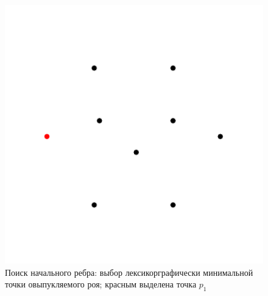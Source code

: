 \documentclass[14pt]{extarticle}
\begin{document}
\begin{figure}[t]
  {}\hfill%
  \begin{minipage}{0.4\textwidth}
    \centering

    \hspace*{-0.1\textwidth}\includegraphics[width=1.25\textwidth]{gift1.pdf}

    \vspace*{-7ex}

    \caption{Поиск начального ребра: выбор лексикорграфически минимальной точки овыпукляемого роя; красным выделена точка $p_1$}
    \label{fig:2D_1}
  \end{minipage}
  \hfill
  \begin{minipage}{0.4\textwidth}
    \centering


\end{minipage}
\end{figure}
\end{document}
